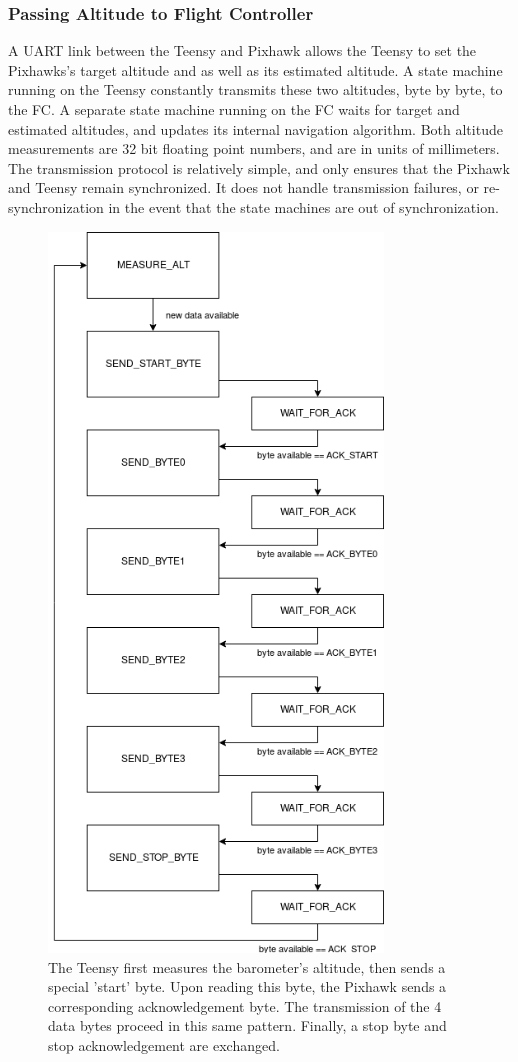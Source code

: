 \documentclass[12pt,journal,compsoc]{IEEEtran}
\begin{document}
\subsubsection{Passing Altitude to Flight Controller}
A UART link between the Teensy and Pixhawk allows the Teensy to set the Pixhawks's target altitude and as well as its estimated altitude. A state machine running on the Teensy constantly transmits these two altitudes, byte by byte, to the FC. A separate state machine running on the FC waits for target and estimated altitudes, and updates its internal navigation algorithm. Both altitude measurements are 32 bit floating point numbers, and are in units of millimeters. The transmission protocol is relatively simple, and only ensures that the Pixhawk and Teensy remain synchronized. It does not handle transmission failures, or re-synchronization in the event that the state machines are out of synchronization. 

\begin{figure}[h!]
\hspace*{0cm}
\centering
\includegraphics[width=3.5in]{altitude_transmission_state_machine.png}
\caption{The Teensy first measures the barometer's altitude, then sends a special 'start' byte. Upon reading this byte, the Pixhawk sends a corresponding acknowledgement byte. The transmission of the 4 data bytes proceed in this same pattern. Finally, a stop byte and stop acknowledgement are exchanged.} 
\end{figure}
  
\end{document}
